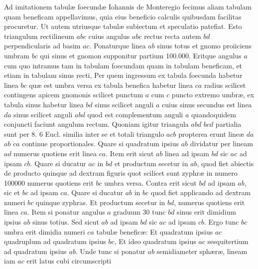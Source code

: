 \documentclass[11pt,a4paper]{article}
\begin{document}
Ad imitationem tabulæ foecundæ Iohannis de Monteregio
fecimus aliam tabulam quam beneficam appellavimus, quia eius
beneficio calculis quibusdam facilitas procuretur. Ut autem utriusque
tabulæ subiectum et speculatio patefiat. Esto triangulum rectilineum
$abc$ cuius angulus $abc$ rectus recta autem $bd$ perpendicularis ad
basim $ac$. Ponaturque linea $ab$ sinus totus et gnomo proiiciens
umbram $bc$ qui sinus et gnomon supponitur partium 100.000.
Eritque angulus $a$ cum quo intramus tam in tabulam foecundam
quam in tabulam beneficam, et etiam in tabulam sinus recti, Per
quem ingressum ex tabula foecunda habetur linea $bc$ quæ est
umbra versa ex tabula benefica habetur linea $ca$ radius scilicet
contingens apicem gnomonis scilicet punctum $a$ cum $c$ puncto
extremo umbræ, ex tabula sinus habetur linea $bd$ sinus scilicet
anguli $a$ cuius sinus secundus est linea $da$ sinus scilicet anguli
$abd$ quod est complementum anguli $a$ quandoquidem conjuncti
faciunt angulum rectum. Quoniam igitur triangula $abd$ $bcd$
partialia sunt per 8. 6 Eucl. similia inter se et totali triangulo
$acb$ propterea erunt lineæ $da$ $ab$ $ca$ continue proportionales.
Quare si quadratum ipsius $ab$ dividatur per lineam $ad$ numerus
quotiens erit linea $ca$. Item erit sicut $ab$ linea ad ipsam
$bd$ sic $ac$ ad ipsam $cb$. Quare si ducatur $ac$ in $bd$ et productum
secetur in $ab$, quod fiet abiectis de producto quinque ad
dextram figuris quot scilicet sunt zyphræ in numero 100000
numerus quotiens erit $bc$ umbra versa. Contra erit sicut $bd$
ad ipsam $ab$, sic et $bc$ ad ipsam $ca$. Quare si ducatur $ab$
in $bc$ quod fiet applicando ad dextram numeri $bc$ quinque
zyphras. Et productum secetur in $bd$, numerus quotiens erit
linea $ca$. Item si ponatur angulus $a$ graduum 30 tunc $bd$
sinus erit dimidium ipsius $ab$ sinus totius. Sed sicut $ab$ ad
ipsam $bd$ sic $ac$ ad ipsam $cb$. Ergo tunc $bc$ umbra erit dimidia
numeri $ca$ tabulæ beneficæ: Et quadratum ipsius $ac$ quadruplum
ad quadratum ipsius $bc$, Et ideo quadratum ipsius $ac$ sesquitertium
ad quadratum ipsius $ab$. Unde tunc si ponatur $ab$
semidiameter sphæræ, lineam iam $ac$ erit latus cubi circumscripti
\end{document}
